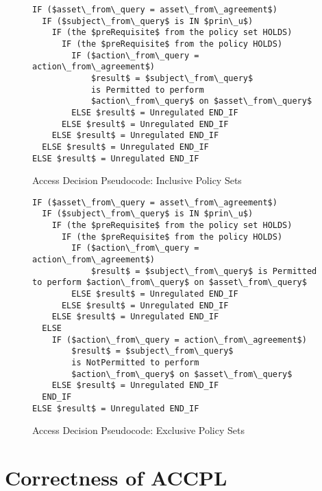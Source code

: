 \documentclass[conference]{IEEEtran}
\begin{document}
\lstset{language=pseudo, captionpos=b}
\begin{figure}
\begin{lstlisting}
IF ($asset\_from\_query = asset\_from\_agreement$)
  IF ($subject\_from\_query$ is IN $prin\_u$)
    IF (the $preRequisite$ from the policy set HOLDS)
      IF (the $preRequisite$ from the policy HOLDS)
        IF ($action\_from\_query = action\_from\_agreement$)
            $result$ = $subject\_from\_query$
            is Permitted to perform
            $action\_from\_query$ on $asset\_from\_query$
        ELSE $result$ = Unregulated END_IF            
      ELSE $result$ = Unregulated END_IF
    ELSE $result$ = Unregulated END_IF
  ELSE $result$ = Unregulated END_IF
ELSE $result$ = Unregulated END_IF
\end{lstlisting}
\caption{Access Decision Pseudocode: Inclusive Policy Sets}
\label{fig:inclusivePS}
\end{figure}
\lstset{language=pseudo, captionpos=b}
\begin{figure}
\begin{lstlisting}
IF ($asset\_from\_query = asset\_from\_agreement$)
  IF ($subject\_from\_query$ is IN $prin\_u$)
    IF (the $preRequisite$ from the policy set HOLDS)
      IF (the $preRequisite$ from the policy HOLDS)
        IF ($action\_from\_query = action\_from\_agreement$)
            $result$ = $subject\_from\_query$ is Permitted to perform $action\_from\_query$ on $asset\_from\_query$
        ELSE $result$ = Unregulated END_IF            
      ELSE $result$ = Unregulated END_IF
    ELSE $result$ = Unregulated END_IF
  ELSE
    IF ($action\_from\_query = action\_from\_agreement$)
        $result$ = $subject\_from\_query$
        is NotPermitted to perform
        $action\_from\_query$ on $asset\_from\_query$
    ELSE $result$ = Unregulated END_IF
  END_IF
ELSE $result$ = Unregulated END_IF
\end{lstlisting}
\caption{Access Decision Pseudocode: Exclusive Policy Sets}
\label{fig:exclusivePS}
\end{figure}
\section{Correctness of ACCPL}\label{sec:maintheorems}
\end{document}
